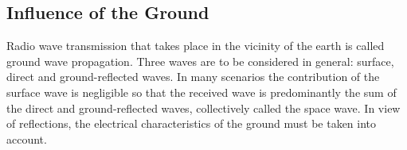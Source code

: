 \documentclass[10pt,journal,twoside]{IEEEtran}
\begin{document}
\subsection{Influence of the Ground}
Radio wave transmission that takes place in the vicinity of the earth is called ground wave propagation. Three waves are to be considered in general: surface, direct and ground-reflected waves. In many scenarios the contribution of the surface wave is negligible so that the received wave is predominantly the sum of the direct and ground-reflected waves, collectively called the space wave. In view of reflections, the electrical characteristics of the ground must be taken into account.%
%
\end{document}
